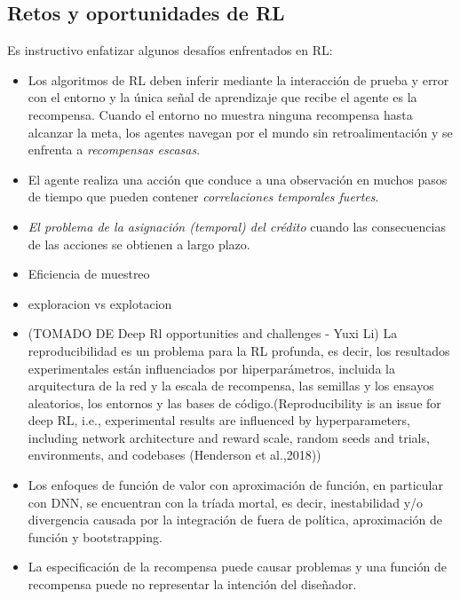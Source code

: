 \documentclass{svproc}
\begin{document}
\subsection{Retos y oportunidades de RL}\label{ss:rl_problems}
Es instructivo enfatizar algunos desafíos enfrentados en RL:\\
\begin{itemize}
\item Los algoritmos de RL deben inferir mediante la interacción de prueba y error con el entorno y la única señal de aprendizaje que recibe el agente es la recompensa. Cuando el entorno no muestra ninguna recompensa hasta alcanzar la meta, los agentes navegan por el mundo sin retroalimentación y se enfrenta a \emph{recompensas escasas}.
\item El agente realiza una acción que conduce a una observación en muchos pasos de tiempo que pueden contener \textit{correlaciones temporales fuertes}.
\item \textit{El problema de la asignación (temporal) del crédito} cuando las consecuencias de las acciones se obtienen a largo plazo.
\item Eficiencia de muestreo
\item exploracion vs explotacion
\item (TOMADO DE Deep Rl opportunities and challenges - Yuxi Li) La reproducibilidad es un problema para la RL profunda, es decir, los resultados experimentales están influenciados por hiperparámetros, incluida la arquitectura de la red y la escala de recompensa, las semillas y los ensayos aleatorios, los entornos y las bases de código.(Reproducibility is an issue for deep RL, i.e., experimental results are influenced by hyperparameters, including network architecture and reward scale, random seeds and trials, environments, and codebases (Henderson et al.,2018))
\item Los enfoques de función de valor con aproximación de función, en particular con DNN, se encuentran con la tríada mortal, es decir, inestabilidad y/o divergencia causada por la integración de fuera de política, aproximación de función y bootstrapping.

\item La especificación de la recompensa puede causar problemas y una función de recompensa puede no representar la intención del diseñador.


\end{itemize}
\end{document}
